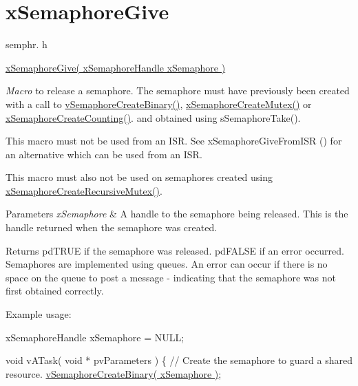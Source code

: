 \hypertarget{group__xSemaphoreGive}{}\section{x\+Semaphore\+Give}
\label{group__xSemaphoreGive}
semphr. h 
\begin{DoxyPre}\hyperlink{semphr_8h_aae55761cabfa9bf85c8f4430f78c0953}{xSemaphoreGive( xSemaphoreHandle xSemaphore )}\end{DoxyPre}


{\itshape Macro} to release a semaphore. The semaphore must have previously been created with a call to \hyperlink{semphr_8h_ae10bffadd26fbd5bcce76bf33a83ef30}{v\+Semaphore\+Create\+Binary()}, \hyperlink{semphr_8h_aa6a00aa9b91a9e5b3ebe4ae1c3f115c6}{x\+Semaphore\+Create\+Mutex()} or \hyperlink{semphr_8h_a7764616a918a46115403569a88148ad4}{x\+Semaphore\+Create\+Counting()}. and obtained using s\+Semaphore\+Take().

This macro must not be used from an I\+SR. See x\+Semaphore\+Give\+From\+I\+SR () for an alternative which can be used from an I\+SR.

This macro must also not be used on semaphores created using \hyperlink{semphr_8h_a1bbc843be5a41ea83d2693b2189fc0f8}{x\+Semaphore\+Create\+Recursive\+Mutex()}.


\begin{DoxyParams}{Parameters}
{\em x\+Semaphore} & A handle to the semaphore being released. This is the handle returned when the semaphore was created.\\
\hline
\end{DoxyParams}
\begin{DoxyReturn}{Returns}
pd\+T\+R\+UE if the semaphore was released. pd\+F\+A\+L\+SE if an error occurred. Semaphores are implemented using queues. An error can occur if there is no space on the queue to post a message -\/ indicating that the semaphore was not first obtained correctly.
\end{DoxyReturn}
Example usage\+: 
\begin{DoxyPre}
xSemaphoreHandle xSemaphore = NULL;\end{DoxyPre}



\begin{DoxyPre}void vATask( void * pvParameters )
\{
   // Create the semaphore to guard a shared resource.
   \hyperlink{semphr_8h_ae10bffadd26fbd5bcce76bf33a83ef30}{vSemaphoreCreateBinary( xSemaphore )};\end{DoxyPre}



